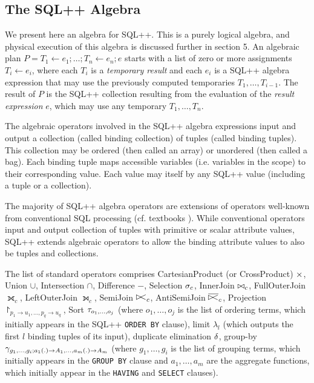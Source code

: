 
\subsection{The SQL++ Algebra}

We present here an algebra for SQL++. This is a purely logical algebra, and physical execution of this algebra is discussed further in section 5. An algebraic plan $P = T_1 \leftarrow e_1 ; \ldots ; T_n \leftarrow e_n; e$ starts with a list of zero or more assignments $T_i \leftarrow e_i$, where each $T_i$ is a {\em temporary result} and each $e_i$ is a SQL++ algebra expression that may use the previously computed temporaries $T_1, \ldots, T_{i-1}$. The result of $P$ is the SQL++ collection resulting from the evaluation of the {\em result expression} $e$, which may use any temporary $T_1, \ldots, T_n$.

The algebraic operators involved in the SQL++ algebra expressions input and output a collection (called binding collection) of tuples (called binding tuples). This collection may be ordered (then called an array) or unordered (then called a bag). Each binding tuple maps accessible variables (i.e. variables in the scope) to their corresponding value. Each value may itself by any SQL++ value (including a tuple or a collection).

The majority of SQL++ algebra operators are extensions of operators well-known from conventional SQL processing (cf. textbooks \cite{Garcia-Molina:2008:DSC:1450931}). While conventional operators input and output collection of tuples with primitive or scalar attribute values, SQL++ extends algebraic operators to allow the binding attribute values to also be tuples and collections.

The list of standard operators comprises CartesianProduct (or CrossProduct) $\times$, Union $\cup$, Intersection $\cap$, Difference $-$, Selection $\sigma_c$, InnerJoin $\bowtie_c$, FullOuterJoin $\fullouterjoin_c$, LeftOuterJoin $\leftouterjoin_c$, SemiJoin $\semijoin_c$, AntiSemiJoin $\antisemijoin_c$, Projection $\project_{p_1 \rightarrow u_1, \dots, p_q \rightarrow u_q}$, Sort $\tau_{o_1, \dots, o_j}$ (where $o_1, \dots, o_j$ is the list of ordering terms, which initially appears in the SQL++ \texttt{ORDER BY} clause), limit $\lambda_l$ (which outputs the first $l$ binding tuples of its input), duplicate elimination $\delta$, group-by $\gamma_{g_1, \dots, g_i; a_1(.) \rightarrow A_1, \ldots, a_m(.) \rightarrow A_m}$ (where $g_1, \dots, g_i$ is the list of grouping terms, which initially appears in the \texttt{GROUP BY} clause and $a_1, \ldots, a_m$ are the aggregate functions, which initially appear in the \texttt{HAVING} and \texttt{SELECT} clauses).

